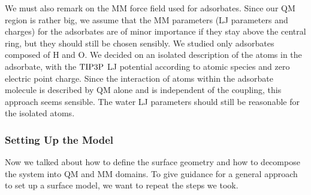 We must also remark on the MM force field used for adsorbates. Since our QM
region is rather big, we assume that the MM parameters (LJ parameters and
charges) for the adsorbates are of minor importance if they stay above the
central ring, but they should still be chosen sensibly. We studied only
adsorbates composed of H and O. We decided on an isolated description of the
atoms in the adsorbate, with the $\text{TIP3P}$ LJ potential according to atomic
species and zero electric point charge. Since the interaction of atoms within
the adsorbate molecule is described by QM alone and is independent of the
coupling, this approach seems sensible. The water LJ parameters should still be
reasonable for the isolated atoms.

\subsubsection{Setting Up the Model}

Now we talked about how to define the surface geometry and how to decompose
the system into QM and MM domains. To give guidance for a general approach to
set up a surface model, we want to repeat the steps we took.

